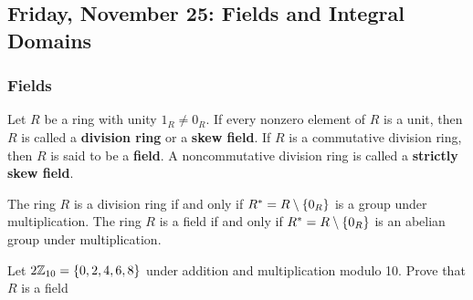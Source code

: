 \subsection{Friday, November 25: Fields and Integral Domains}

\subsubsection{Fields}

\begin{definition}[Fields]
    Let $R$ be a ring with unity $1_R \neq 0_R$. If every nonzero element of $R$ is a unit, then $R$ is called a \textbf{division ring} or a \textbf{skew field}. If $R$ is a commutative division ring, then $R$ is said to be a \textbf{field}. A noncommutative division ring is called a \textbf{strictly skew field}.
\end{definition}

\begin{remark}
    The ring $R$ is a division ring if and only if $R^{\ast} = R \setminus \qty{0_R}$ is a group under multiplication. The ring $R$ is a field if and only if $R^{\ast} = R \setminus \qty{0_R}$ is an abelian group under multiplication.
\end{remark}

\begin{exercise}
    Let $2\mathbb{Z}_{10} = \qty{0, 2, 4, 6, 8}$ under addition and multiplication modulo 10. Prove that $R$ is a field
\end{exercise}

